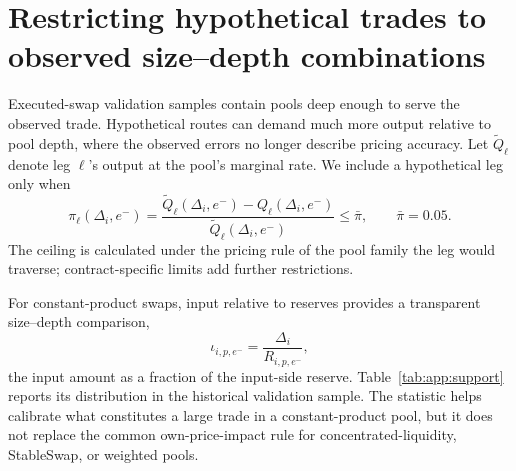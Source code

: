 \section{Restricting hypothetical trades to observed size--depth combinations}
\label{app:support}

Executed-swap validation samples contain pools deep enough to serve the observed trade. Hypothetical routes can demand much more output relative to pool depth, where the observed errors no longer describe pricing accuracy. Let $\widetilde Q_{\ell}$ denote leg $\ell$'s output at the pool's marginal rate. We include a hypothetical leg only when
\begin{equation}
\label{eq:support}
\pi_{\ell}(\Delta_i,e^-)=\frac{\widetilde Q_{\ell}(\Delta_i,e^-)-Q_{\ell}(\Delta_i,e^-)}{\widetilde Q_{\ell}(\Delta_i,e^-)}\leq \bar\pi,
\qquad \bar\pi=0.05.
\end{equation}
The ceiling is calculated under the pricing rule of the pool family the leg would traverse; contract-specific limits add further restrictions.

For constant-product swaps, input relative to reserves provides a transparent size--depth comparison,
\[
\iota_{i,p,e^-}=\frac{\Delta_i}{R_{i,p,e^-}},
\]
the input amount as a fraction of the input-side reserve. Table~\ref{tab:app:support} reports its distribution in the historical validation sample. The statistic helps calibrate what constitutes a large trade in a constant-product pool, but it does not replace the common own-price-impact rule for concentrated-liquidity, StableSwap, or weighted pools.

